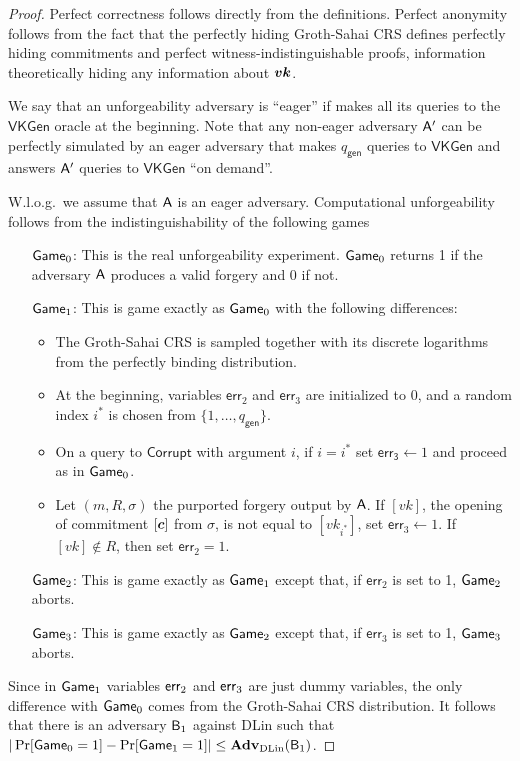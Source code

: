 \begin{proof}
Perfect correctness follows directly from the definitions. Perfect anonymity follows from the fact that the perfectly hiding Groth-Sahai CRS defines perfectly hiding commitments and perfect witness-indistinguishable proofs, information theoretically hiding any information about ${\boldsymbol{vk}}$.

We say that an unforgeability adversary is ``eager'' if  makes all its queries to the $\mathsf{VKGen}$ oracle at the beginning. Note that any non-eager adversary $\mathsf{A}'$ can be perfectly simulated  by an eager adversary that makes ${q_\mathsf{gen}}$ queries to $\mathsf{VKGen}$ and answers $\mathsf{A}'$ queries to $\mathsf{VKGen}$ ``on demand''.

W.l.o.g.~we assume that $\mathsf{A}$ is an eager adversary. Computational unforgeability follows from the indistinguishability of the following games
\begin{itemize}
\item[$\mathsf{Game}_0$:] This is the real unforgeability experiment. $\mathsf{Game}_0$ returns 1 if the adversary $\mathsf{A}$ produces a valid forgery and 0 if not.
\item[$\mathsf{Game}_1$:] This is game exactly as $\mathsf{Game}_0$ with the following differences: 
    \begin{itemize}
    \item The Groth-Sahai CRS is sampled together with its discrete logarithms from the perfectly binding distribution.
    \item At the beginning, variables $\mathsf{err}_2$ and $\mathsf{err}_3$ are initialized to $0$, and a random index $i^*$ is chosen from $\{1,\ldots, q_\mathsf{gen}\}$.
    \item On a query to $\mathsf{Corrupt}$ with argument $i$, if $i=i^*$ set $\mathsf{err_3}\gets 1$ and proceed as in $\mathsf{Game}_0$.
    \item Let $(m,R,\sigma)$ the purported forgery output by $\mathsf{A}$. If $[vk]$, the opening of commitment $[{\boldsymbol{c}}]$ from $\sigma$, is not equal to $[vk_{i^*}]$,  set $\mathsf{err}_3\gets 1$. If $[vk]\notin R$, then set $\mathsf{err}_2=1$.
    \end{itemize}
\item[$\mathsf{Game}_2$:] This is game exactly as $\mathsf{Game}_1$ except that, if $\mathsf{err}_2$ is set to 1, $\mathsf{Game}_2$ aborts.
\item[$\mathsf{Game}_3$:] This is game exactly as $\mathsf{Game}_2$ except that, if $\mathsf{err}_3$ is set to 1, $\mathsf{Game}_3$ aborts. 
\end{itemize}
Since in $\mathsf{Game}_1$ variables $\mathsf{err}_2$ and $\mathsf{err}_3$ are just dummy variables, the only difference with $\mathsf{Game}_0$ comes from the Groth-Sahai CRS distribution. It follows that there is an adversary $\mathsf{B}_{1}$ against DLin such that $|\Pr[\mathsf{Game}_0=1]-\Pr[\mathsf{Game}_1=1]|\leq \mathbf{Adv}_{\mathrm{DLin}}(\mathsf{B}_{1})$.


\end{proof}
